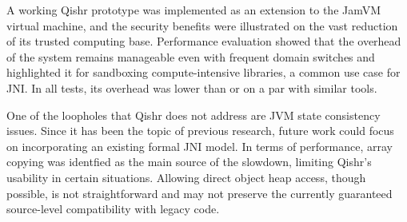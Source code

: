 \documentclass[a4paper,12pt,twoside,openright]{report}
\begin{document}
A working Qishr prototype was implemented as an extension to the JamVM virtual machine, and the security benefits were illustrated on the vast reduction of its trusted computing base. Performance evaluation showed that the overhead of the system remains manageable even with frequent domain switches and highlighted it for sandboxing compute-intensive libraries, a common use case for JNI. In all tests, its overhead was lower than or on a par with similar tools.

One of the loopholes that Qishr does not address are JVM state consistency issues. Since it has been the topic of previous research, future work could focus on incorporating an existing formal JNI model. In terms of performance, array copying was identfied as the main source of the slowdown, limiting Qishr's usability in certain situations. Allowing direct object heap access, though possible, is not straightforward and may not preserve the currently guaranteed source-level compatibility with legacy code.

\appendix
\singlespacing

 
 
\end{document}

